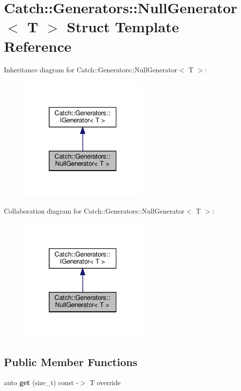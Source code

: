 \hypertarget{structCatch_1_1Generators_1_1NullGenerator}{}\section{Catch\+::Generators\+::Null\+Generator$<$ T $>$ Struct Template Reference}
\label{structCatch_1_1Generators_1_1NullGenerator}


Inheritance diagram for Catch\+::Generators\+::Null\+Generator$<$ T $>$\+:\nopagebreak
\begin{figure}[H]
\begin{center}
\leavevmode
\includegraphics[width=183pt]{structCatch_1_1Generators_1_1NullGenerator__inherit__graph}
\end{center}
\end{figure}


Collaboration diagram for Catch\+::Generators\+::Null\+Generator$<$ T $>$\+:\nopagebreak
\begin{figure}[H]
\begin{center}
\leavevmode
\includegraphics[width=183pt]{structCatch_1_1Generators_1_1NullGenerator__coll__graph}
\end{center}
\end{figure}
\subsection*{Public Member Functions}
\begin{DoxyCompactItemize}
\item 
\mbox{\label{structCatch_1_1Generators_1_1NullGenerator_a17a2cc82d644e97afded4017c7a062ef}} 
auto {\bfseries get} (size\+\_\+t) const -\/$>$ T override
\end{DoxyCompactItemize}


